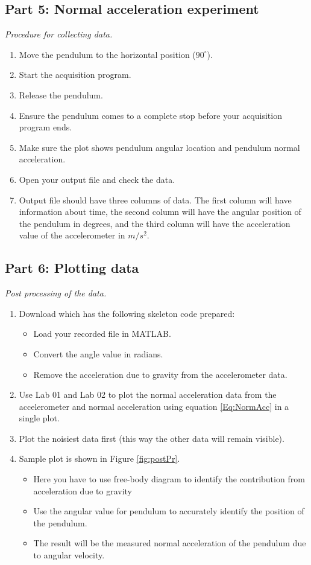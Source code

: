 \documentclass{article} %
\begin{document}
\subsection{Part 5: Normal acceleration experiment}
\emph {Procedure for collecting data.}
\begin{enumerate}
    \item Move the pendulum to the horizontal position ($90^\circ$).
    \item Start the acquisition program.
    \item Release the pendulum.
    \item Ensure the pendulum comes to a complete stop before your acquisition program ends. 
    \item Make sure the plot shows pendulum angular location and pendulum normal acceleration.
    \item Open your output file and check the data.
    \item Output file should have three columns of data. The first column will have information about time, the second column will have the angular position of the pendulum in degrees, and the third column will have the acceleration value of the accelerometer in $m/s^2$.
\end{enumerate}

\subsection{Part 6: Plotting data}
\emph{Post processing of the data.}
\begin{enumerate}
\item Download  which has the following skeleton code prepared:
\begin{itemize}
    \item Load your recorded  file in MATLAB.
    \item Convert the angle value in radians.
    \item Remove the acceleration due to gravity from the accelerometer data.
\end{itemize}
\item Use Lab 01 and Lab 02 to plot the normal acceleration data from the accelerometer and normal acceleration using equation \ref{Eq:NormAcc} in a single plot.
\item Plot the noisiest data first (this way the other data will remain visible). 
\item Sample plot is shown in Figure \ref{fig:postPr}.
\begin{itemize}
    \item Here you have to use free-body diagram to identify the contribution from acceleration due to gravity
    \item Use the angular value for pendulum to accurately identify the position of the pendulum.
    \item The result will be the measured normal acceleration of the pendulum due to angular velocity.
\end{itemize}
\end{enumerate}
\end{document}
